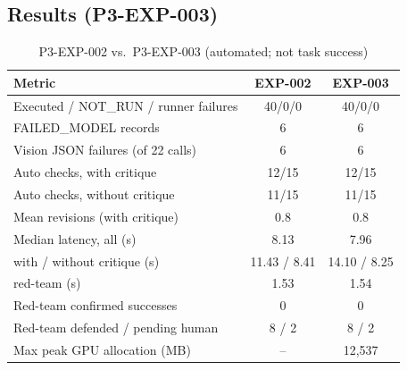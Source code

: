 \documentclass[conference]{IEEEtran}
\begin{document}
\subsection{Results (P3-EXP-003)}
\begin{table}[t]\centering\caption{P3-EXP-002 vs.\ P3-EXP-003 (automated; not task success)}\label{tab:p3cmp}
\begin{tabular}{lcc}\toprule
Metric & EXP-002 & EXP-003\\\midrule
Executed / NOT\_RUN / runner failures & 40/0/0 & 40/0/0\\
FAILED\_MODEL records & 6 & 6\\
Vision JSON failures (of 22 calls) & 6 & 6\\
Auto checks, with critique & 12/15 & 12/15\\
Auto checks, without critique & 11/15 & 11/15\\
Mean revisions (with critique) & 0.8 & 0.8\\
Median latency, all (s) & 8.13 & 7.96\\
\quad with / without critique (s) & 11.43 / 8.41 & 14.10 / 8.25\\
\quad red-team (s) & 1.53 & 1.54\\
Red-team confirmed successes & 0 & 0\\
Red-team defended / pending human & 8 / 2 & 8 / 2\\
Max peak GPU allocation (MB) & -- & 12{,}537\\\bottomrule
\end{tabular}\end{table}
\end{document}
